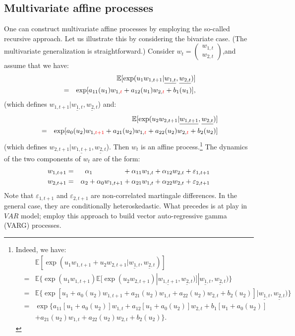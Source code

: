 \documentclass[
  12pt,
]{book}
\theoremstyle{definition}
\theoremstyle{definition}
\theoremstyle{definition}
\theoremstyle{definition}
\theoremstyle{remark}
\begin{document}
\hypertarget{buildingmulti}{%
\subsection{Multivariate affine processes}\label{buildingmulti}}

One can construct multivariate affine processes by employing the so-called recursive approach. Let us illustrate this by considering the bivariate case. (The multivariate generalization is straightforward.) Consider \(w_t = \left(\begin{array}{c} w_{1,t}\\ w_{2,t} \end{array} \right)\),and assume that we have:
\begin{eqnarray*}
&&\mathbb{E}[\exp(u_1 w_{1,t+1}|\underline{w_{1,t}}, \underline{w_{2,t}})]\\
&=& \exp[a_{11}(u_1)w_{1,{\color{red}{t}}}+a_{12}(u_1)w_{2,{\color{red}{t}}}+b_{1}(u_1)],
\end{eqnarray*}
(which defines \(w_{1,t+1}|\underline{w_{1,t}}, \underline{w_{2,t}}\)) and:
\begin{eqnarray*}
&& \mathbb{E}[\exp(u_2 w_{2,t+1}|\underline{w_{1,t+1}}, \underline{w_{2,t}})]\\
&= & \exp[a_0(u_2)w_{1,{\color{red}{t+1}}}+a_{21}(u_2)w_{1,{\color{red}{t}}}+a_{22}(u_2)w_{2,{\color{red}{t}}}+b_2(u_2)]
\end{eqnarray*}
(which defines \(w_{2,t+1}|\underline{w_{1,t+1}}, \underline{w_{2,t}}\)). Then \(w_t\) is an affine process.\footnote{Indeed, we have:
  \begin{eqnarray*}
  && \mathbb{E}[\exp(u_1 w_{1,t+1}+u_2 w_{2,t+1}|\underline{w_{1,t}}, \underline{w_{2,t}})]\\
  &= & \mathbb{E}\{\exp(u_1 w_{1,t+1}) \mathbb{E}[\exp(u_{2}w_{2,t+1})|\underline{w_{1,t+1}}, \underline{w_{2,t}})]|\underline{w_{1,t}}, \underline{w_{2,t}})\} \\
  &= & \mathbb{E}\{\exp[u_1+a_0(u_2)w_{1,t+1}+a_{21}(u_2)w_{1,t} + a_{22}(u_2)w_{2,t}+b_2(u_2)]|\underline{w_{1,t}}, \underline{w_{2,t}})\} \\
  &= & \exp\{a_{11}[u_1+a_0(u_2)]w_{1,t}+a_{12}[u_1+a_0(u_2)]w_{2,t}+b_1[u_1+a_0(u_2)] \\
  &&+  a_{21}(u_2)w_{1,t}+a_{22}(u_2)w_{2,t}+b_2(u_2)\}.
  \end{eqnarray*}}
The dynamics of the two components of \(w_t\) are of the form:
\begin{eqnarray*}
w_{1,t+1} &=& \alpha_1 \hspace{1.55cm} + \alpha_{11}w_{1,t} + \alpha_{12}w_{2,t} + \varepsilon_{1,t+1} \\
w_{2,t+1} &=& \alpha_2 + \alpha_{0}w_{1,t+1} + \alpha_{21}w_{1,t} + \alpha _{22} w_{2,t} + \varepsilon_{2,t+1}
\end{eqnarray*}
Note that \(\varepsilon_{1,t+1}\) and \(\varepsilon_{2,t+1}\) are non-correlated martingale differences. In the general case, they are conditionally heteroskedastic. What precedes is at play in \(VAR\) model; \citet{zarg_2017} employ this approach to build vector auto-regressive gamma (VARG) processes.
\end{document}
